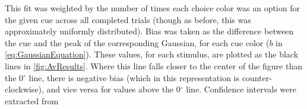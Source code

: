 This fit was weighted by the number of times each choice color was an option for the given cue across all completed trials (though as before, this was approximately uniformly distributed). 
Bias was taken as the difference between the cue and the peak of the corresponding Gaussian, for each cue color ($b$ in \autoref{eq:GaussianEquation}). 
These values, for each stimulus, are plotted as the black lines in \autoref{fig:AvResults}.
Where this line falls closer to the center of the figure than the 0$^{\circ}$ line, there is negative bias (which in this representation is counter-clockwise), and vice versa for values above the 0$^{\circ}$ line.
Confidence intervals were extracted from 

%

